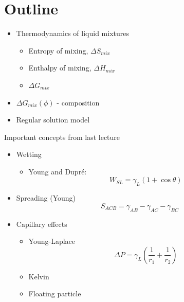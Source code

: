 \documentclass[a4paper, 11pt, normalem]{report}
\begin{document}
\section{Outline}
\begin{itemize}
    \item Thermodynamics of liquid mixtures
        \begin{itemize}
            \item Entropy of mixing, $\Delta S_{mix}$
            \item Enthalpy of mixing, $\Delta H_{mix}$
            \item $\Delta G_{mix}$
        \end{itemize}
    \item $\Delta G_{mix}(\phi)$ - composition
    \item Regular solution model
\end{itemize}

Important concepts from last lecture
\begin{itemize}
    \item Wetting
        \begin{itemize}
            \item Young and Dupr\'{e}:
                \begin{equation}
                    W_{SL} = \gamma_L(1+\cos\theta)
                \end{equation}
        \end{itemize}
    \item Spreading (Young)
        \begin{equation}
            S_{ACB} = \gamma_{AB} - \gamma_{AC} - \gamma_{BC}
        \end{equation}
    \item Capillary effects
        \begin{itemize}
            \item Young-Laplace 
                \begin{equation}
                    \Delta P = \gamma_L\left(\frac{1}{r_1}+\frac{1}{r_2}\right)
                \end{equation}
            \item Kelvin
            \item Floating particle
        \end{itemize}
\end{itemize}
\end{document}
